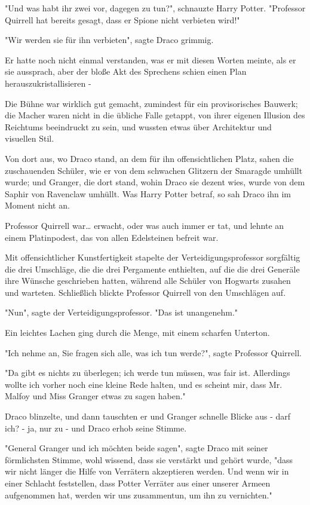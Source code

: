 {"Und was habt ihr zwei vor, dagegen zu tun?", schnauzte Harry Potter. "Professor Quirrell hat bereits gesagt, dass er Spione nicht verbieten wird!"

"Wir werden sie für ihn verbieten", sagte Draco grimmig.

Er hatte noch nicht einmal verstanden, was er mit diesen Worten meinte, als er sie aussprach, aber der bloße Akt des Sprechens schien einen Plan herauszukristallisieren -

Die Bühne war wirklich gut gemacht, zumindest für ein provisorisches Bauwerk; die Macher waren nicht in die übliche Falle getappt, von ihrer eigenen Illusion des Reichtums beeindruckt zu sein, und wussten etwas über Architektur und visuellen Stil.

Von dort aus, wo Draco stand, an dem für ihn offensichtlichen Platz, sahen die zuschauenden Schüler, wie er von dem schwachen Glitzern der Smaragde umhüllt wurde; und Granger, die dort stand, wohin Draco sie dezent wies, wurde von dem Saphir von Ravenclaw umhüllt. Was Harry Potter betraf, so sah Draco ihn im Moment nicht an.

Professor Quirrell war… erwacht, oder was auch immer er tat, und lehnte an einem Platinpodest, das von allen Edelsteinen befreit war.

Mit offensichtlicher Kunstfertigkeit stapelte der Verteidigungsprofessor sorgfältig die drei Umschläge, die die drei Pergamente enthielten, auf die die drei Generäle ihre Wünsche geschrieben hatten, während alle Schüler von Hogwarts zusahen und warteten. Schließlich blickte Professor Quirrell von den Umschlägen auf.

"Nun", sagte der Verteidigungsprofessor. "Das ist unangenehm."

Ein leichtes Lachen ging durch die Menge, mit einem scharfen Unterton.

"Ich nehme an, Sie fragen sich alle, was ich tun werde?", sagte Professor Quirrell.

"Da gibt es nichts zu überlegen; ich werde tun müssen, was fair ist. Allerdings wollte ich vorher noch eine kleine Rede halten, und es scheint mir, dass Mr. Malfoy und Miss Granger etwas zu sagen haben."

Draco blinzelte, und dann tauschten er und Granger schnelle Blicke aus - darf ich? - ja, nur zu - und Draco erhob seine Stimme.

"General Granger und ich möchten beide sagen", sagte Draco mit seiner förmlichsten Stimme, wohl wissend, dass sie verstärkt und gehört wurde, "dass wir nicht länger die Hilfe von Verrätern akzeptieren werden. Und wenn wir in einer Schlacht feststellen, dass Potter Verräter aus einer unserer Armeen aufgenommen hat, werden wir uns zusammentun, um ihn zu vernichten."

}
